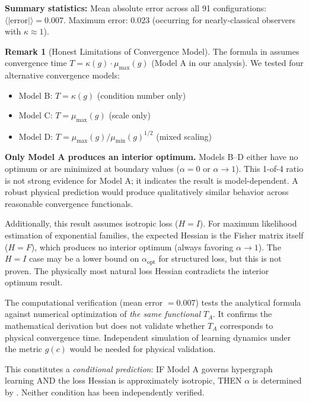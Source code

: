 \documentclass[11pt,a4paper]{article}
\theoremstyle{plain}
\theoremstyle{definition}
\newtheorem{remark}[theorem]{Remark}
\theoremstyle{remark}
\begin{document}
\textbf{Summary statistics:} Mean absolute error across all 91 configurations: $\langle |\text{error}| \rangle = 0.007$. Maximum error: $0.023$ (occurring for nearly-classical observers with $\kappa \approx 1$).

\begin{remark}[Honest Limitations of Convergence Model]
\label{rem:convergence_model}
The formula in  assumes convergence time $T = \kappa(g) \cdot \mu_{\max}(g)$ (Model A in our analysis). We tested four alternative convergence models:
\begin{itemize}[noitemsep]
\item Model B: $T = \kappa(g)$ (condition number only)
\item Model C: $T = \mu_{\max}(g)$ (scale only)
\item Model D: $T = \mu_{\max}(g) / \mu_{\min}(g)^{1/2}$ (mixed scaling)
\end{itemize}

\textbf{Only Model A produces an interior optimum.} Models B--D either have no optimum or are minimized at boundary values ($\alpha = 0$ or $\alpha \to 1$). This 1-of-4 ratio is not strong evidence for Model A; it indicates the result is model-dependent. A robust physical prediction would produce qualitatively similar behavior across reasonable convergence functionals.

Additionally, this result assumes isotropic loss ($H = I$). For maximum likelihood estimation of exponential families, the expected Hessian is the Fisher matrix itself ($H = F$), which produces no interior optimum (always favoring $\alpha \to 1$). The $H = I$ case may be a lower bound on $\alpha_{\mathrm{opt}}$ for structured loss, but this is not proven. The physically most natural loss Hessian contradicts the interior optimum result.

The computational verification (mean error $= 0.007$) tests the analytical formula against numerical optimization of \emph{the same functional} $T_A$. It confirms the mathematical derivation but does not validate whether $T_A$ corresponds to physical convergence time. Independent simulation of learning dynamics under the metric $g(c)$ would be needed for physical validation.

This constitutes a \emph{conditional prediction}: IF Model A governs hypergraph learning AND the loss Hessian is approximately isotropic, THEN $\alpha$ is determined by . Neither condition has been independently verified.
\end{remark}
\end{document}

